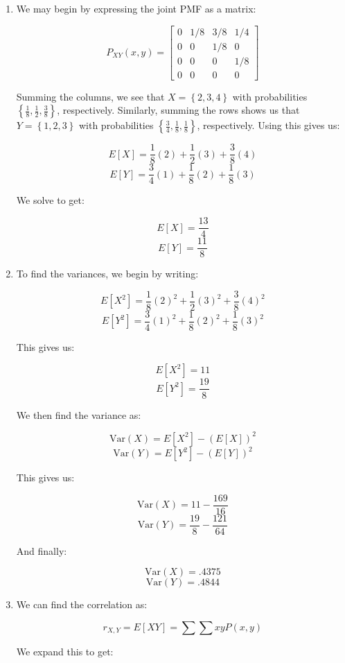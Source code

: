 \begin{enumerate}
\begin{enumerate}
      \item We may begin by expressing the joint PMF as a matrix:

        $$P_{XY}(x,y)=\left[ \begin{matrix} 0 & 1/8 & 3/8 & 1/4\\ 0 & 0 & 1/8 & 0\\ 0 & 0 & 0 & 1/8\\ 0 & 0 & 0 & 0\end{matrix} \right]$$

        Summing the columns, we see that $X=\left\{ 2,3,4 \right\}$ with probabilities $\left\{ \frac{1}{8}, \frac{1}{2}, \frac{3}{8} \right\}$, respectively. Similarly, summing the rows shows us that $Y=\left\{ 1,2,3 \right\}$  with probabilities $\left\{ \frac{3}{4}, \frac{1}{8}, \frac{1}{8} \right\}$, respectively. Using this gives us:

        $$E[X]=\frac{1}{8}(2)+\frac{1}{2}(3)+\frac{3}{8}(4)$$
        $$E[Y]=\frac{3}{4}(1)+\frac{1}{8}(2)+\frac{1}{8}(3)$$

        We solve to get:

        $$\boxed{E[X]=\frac{13}{4}}$$
        $$\boxed{E[Y]=\frac{11}{8}}$$

      \item To find the variances, we begin by writing:

        $$E[X^2]=\frac{1}{8}(2)^2+\frac{1}{2}(3)^2+\frac{3}{8}(4)^2$$
        $$E[Y^2]=\frac{3}{4}(1)^2+\frac{1}{8}(2)^2+\frac{1}{8}(3)^2$$

        This gives us:

        $$E[X^2]=11$$
        $$E[Y^2]=\frac{19}{8}$$

        We then find the variance as:

        $$\text{Var}(X)=E[X^2]-(E[X])^2$$
        $$\text{Var}(Y)=E[Y^2]-(E[Y])^2$$

        This gives us:

        $$\text{Var}(X)=11-\frac{169}{16}$$
        $$\text{Var}(Y)=\frac{19}{8}-\frac{121}{64}$$

        And finally:

        $$\boxed{\text{Var}(X)=.4375}$$
        $$\boxed{\text{Var}(Y)=.4844}$$

      \item We can find the correlation as:

        $$r_{X,Y}=E[XY]=\sum\sum xyP(x,y)$$

        We expand this to get:


\end{enumerate}
\end{enumerate}
